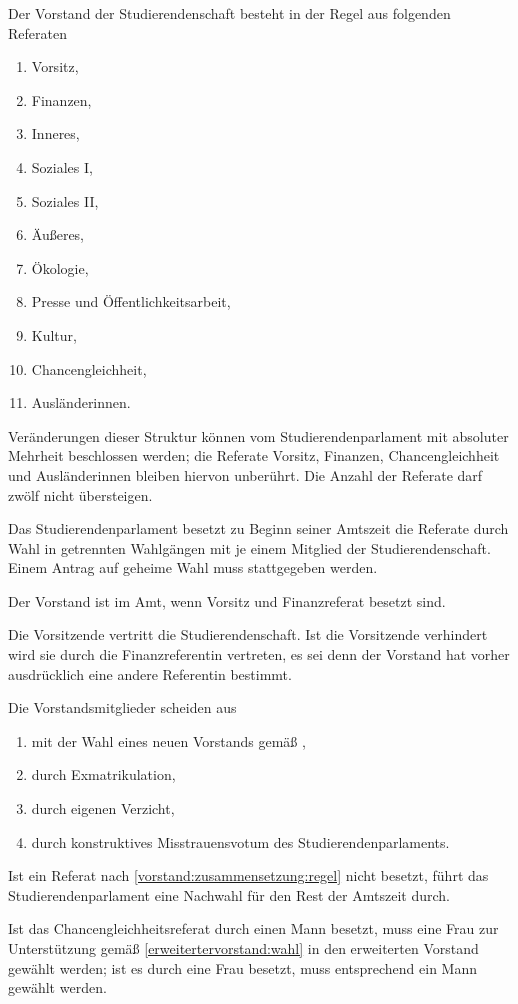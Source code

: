 \begin{jurdoc}
Der Vorstand der Studierendenschaft besteht in der Regel aus folgenden Referaten \label{vorstand:zusammensetzung:regel}
\begin{enumerate}
\item Vorsitz,
\item Finanzen,
\item Inneres,
\item Soziales I,
\item Soziales II,
\item Äußeres,
\item Ökologie,
\item Presse und Öffentlichkeitsarbeit,
\item Kultur,
\item Chancengleichheit,
\item Ausländerinnen.
\end{enumerate}
Veränderungen dieser Struktur können vom Studierendenparlament mit absoluter Mehrheit beschlossen werden; die Referate Vorsitz, Finanzen, Chancengleichheit und Ausländerinnen bleiben hiervon unberührt. Die Anzahl der Referate darf zwölf nicht übersteigen.

Das Studierendenparlament besetzt zu Beginn seiner Amtszeit die Referate durch Wahl in getrennten Wahlgängen mit je einem Mitglied der Studierendenschaft. Einem Antrag auf geheime Wahl muss stattgegeben werden\label{vorstand:zusammensetzung:wahl}.

Der Vorstand ist im Amt, wenn Vorsitz und Finanzreferat besetzt sind.

Die Vorsitzende vertritt die Studierendenschaft. Ist die Vorsitzende  verhindert wird sie durch die Finanzreferentin vertreten, es sei denn der Vorstand hat vorher ausdrücklich eine andere Referentin bestimmt.

Die Vorstandsmitglieder scheiden aus
  \begin{enumerate}
  \item mit der Wahl eines neuen Vorstands gemäß ,
  \item durch Exmatrikulation,
  \item durch eigenen Verzicht,
  \item durch konstruktives Misstrauensvotum des Studierendenparlaments.
  \end{enumerate}
    Ist ein Referat nach \ref{vorstand:zusammensetzung:regel} nicht besetzt, führt das Studierendenparlament eine Nachwahl für den Rest der Amtszeit durch.

Ist das Chancengleichheitsreferat durch einen Mann besetzt, muss eine Frau zur Unterstützung gemäß \ref{erweitertervorstand:wahl} in den erweiterten Vorstand gewählt werden; ist es durch eine Frau besetzt, muss entsprechend ein Mann gewählt werden.



\end{jurdoc}
